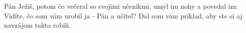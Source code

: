 Pán Ježiš, potom čo večeral so svojimi učeníkmi, umyl im nohy a povedal im:
Vidíte, čo som vám urobil ja - Pán a učiteľ? Dal som vám príklad, aby ste si aj navzájom takto robili.